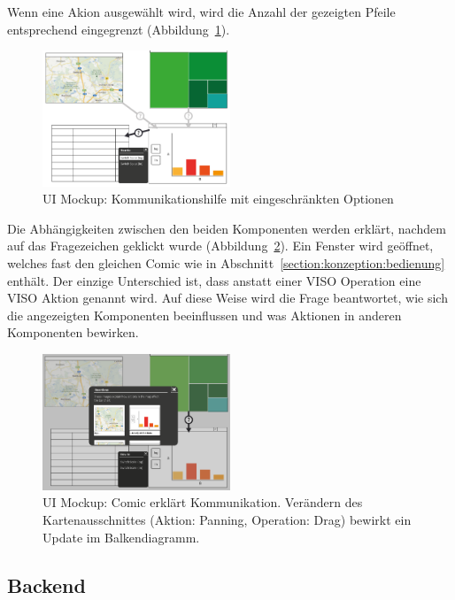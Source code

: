 \documentclass[
	headsepline,
	footsepline,
	fontsize=12pt,
	bibliography=totoc
]{scrbook}
\begin{document}
Wenn eine Akion ausgewählt wird, wird die Anzahl der gezeigten Pfeile entsprechend eingegrenzt (Abbildung~\ref{figure:kommunikation-step2}).

\begin{figure}[htbp]
   \centering
   \includegraphics[width=0.5\textwidth]{images/konzeption-kommunikation-step2.png}
   \caption{UI Mockup: Kommunikationshilfe mit eingeschränkten Optionen}
   \label{figure:kommunikation-step2}
\end{figure}

Die Abhängigkeiten zwischen den beiden Komponenten werden erklärt, nachdem auf das Fragezeichen geklickt wurde (Abbildung~\ref{figure:kommunikation-step3}). Ein Fenster wird geöffnet, welches fast den gleichen Comic wie in Abschnitt~\ref{section:konzeption:bedienung} enthält. Der einzige Unterschied ist, dass anstatt einer VISO Operation eine VISO Aktion genannt wird. Auf diese Weise wird die Frage beantwortet, wie sich die angezeigten Komponenten beeinflussen und was Aktionen in anderen Komponenten bewirken.

\begin{figure}[htbp]
   \centering
   \includegraphics[width=0.5\textwidth]{images/konzeption-kommunikation-step3.png}
   \caption{UI Mockup: Comic erklärt Kommunikation. Verändern des Kartenausschnittes (Aktion: Panning, Operation: Drag) bewirkt ein Update im Balkendiagramm.}
   \label{figure:kommunikation-step3}
\end{figure}

\subsection{Backend}
\label{section:konzeption:kommunikation:backend}
\end{document}
